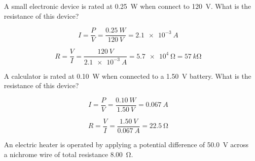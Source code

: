 \documentclass[]{exam}
\begin{document}
\begin{questions}
\question
A small electronic device is rated at \SI{0.25}{W} when connect to \SI{120}{V}. What is the resistance of this device?

\begin{solution}
\begin{equation*}
    I = \frac{P}{V} = \frac{\SI{0.25}{W}}{\SI{120}{V}} = \SI{2.1e-3}{A}
\end{equation*}

\begin{equation*}
    R = \frac{V}{I} = \frac{\SI{120}{V}}{\SI{2.1e-3}{A}} = \boxed{\SI{5.7e4}{\ohm}} = \SI{57}{k\ohm}
\end{equation*}
\end{solution}

\question
A calculator is rated at \SI{0.10}{W} when connected to a \SI{1.50}{V} battery. What is the resistance of this device?

\begin{solution}
\begin{equation*}
    I = \frac{P}{V} = \frac{\SI{0.10}{W}}{\SI{1.50}{V}} = \SI{0.067}{A}
\end{equation*}

\begin{equation*}
    R = \frac{V}{I} = \frac{\SI{1.50}{V}}{\SI{0.067}{A}} = \boxed{\SI{22.5}{\ohm}} 
\end{equation*}
\end{solution}

\question
An electric heater is operated by applying a potential difference of \SI{50.0}{V} across a nichrome wire of total resistance \SI{8.00}{\ohm}.




\end{questions}
\end{document}
